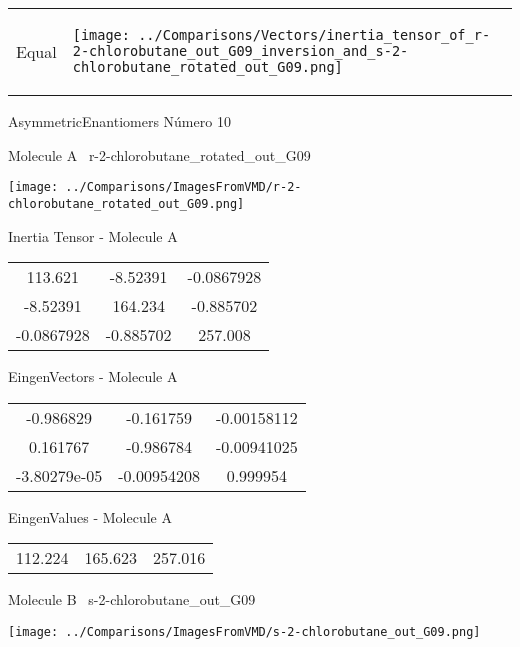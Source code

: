 \vtab[-5mm]
\begin{tabular}{*{2}{m{}}}
\begin{center}
\textcolor{NavyBlue}{\Large Equal}
\end{center}
&
\begin{center}
\texttt{[image: ../Comparisons/Vectors/inertia\_tensor\_of\_r-2-chlorobutane\_out\_G09\_inversion\_and\_s-2-chlorobutane\_rotated\_out\_G09.png]}
\end{center}
\end{tabular}

 \newpage

\vtab[-3cm]
\begin{center}
{\large AsymmetricEnantiomers \tab Número 10}
\end{center}
\begin{multicols}{2}
\begin{center}

Molecule A \
r-2-chlorobutane\_rotated\_out\_G09

\texttt{[image: ../Comparisons/ImagesFromVMD/r-2-chlorobutane\_rotated\_out\_G09.png]}

Inertia Tensor - Molecule A \\
\begin{tabular}{|c c c|}
113.621	 & 	-8.52391	 & 	-0.0867928	 \\
-8.52391	 & 	164.234	 & 	-0.885702	 \\
-0.0867928	 & 	-0.885702	 & 	257.008
\end{tabular}

\vtab
 EingenVectors - Molecule A     \\
\begin{tabular}{|c c c|}
-0.986829	 & 	-0.161759	 & 	-0.00158112	 \\
0.161767	 & 	-0.986784	 & 	-0.00941025	 \\
-3.80279e-05	 & 	-0.00954208	 & 	0.999954
\end{tabular}

\vtab
 EingenValues - Molecule A     \\
\begin{tabular}{|c c c|}
112.224	 & 	165.623	 & 	257.016	 \\
\end{tabular}
\columnbreak

Molecule B \
s-2-chlorobutane\_out\_G09

\texttt{[image: ../Comparisons/ImagesFromVMD/s-2-chlorobutane\_out\_G09.png]}


\end{center}
\end{multicols}
